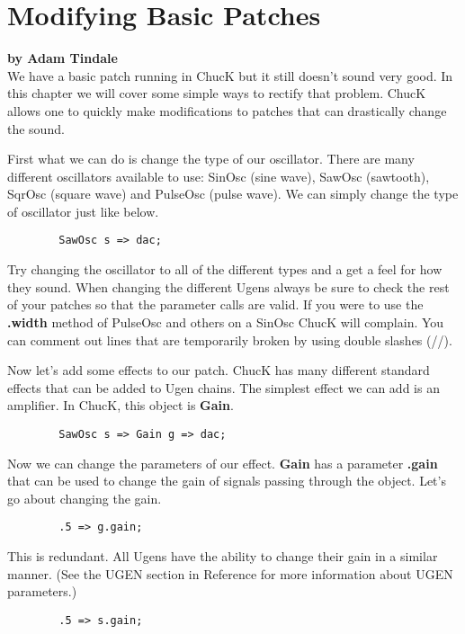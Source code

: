 \section{Modifying Basic Patches}
\textbf{by Adam Tindale}\\

We have a basic patch running in ChucK but it still doesn't sound very good. In this chapter we will cover some simple ways to rectify that problem. ChucK allows one to quickly make modifications to patches that can drastically change the sound.

First what we can do is change the type of our oscillator. There are many different oscillators available to use: SinOsc (sine wave), SawOsc (sawtooth), SqrOsc (square wave) and PulseOsc (pulse wave). We can simply change the type of oscillator just like below. 

\begin{verbatim}
        SawOsc s => dac;
\end{verbatim}

Try changing the oscillator to all of the different types and a get a feel for how they sound. When changing the different Ugens always be sure to check the rest of your patches so that the parameter calls are valid. If you were to use the {\bf .width} method of PulseOsc and others on a SinOsc ChucK will complain. You can comment out lines that are temporarily broken by using double slashes (//).

Now let's add some effects to our patch. ChucK has many different standard effects that can be added to Ugen chains. The simplest effect we can add is an amplifier. In ChucK, this object is {\bf Gain}.

\begin{verbatim}
        SawOsc s => Gain g => dac;
\end{verbatim}

Now we can change the parameters of our effect. {\bf Gain} has a parameter {\bf .gain} that can be used to change the gain  of signals passing through the object. Let's go about changing the gain.

\begin{verbatim}
        .5 => g.gain;
\end{verbatim}

This is redundant. All Ugens have the ability to change their gain in a similar manner. (See the UGEN section in Reference for more information about UGEN parameters.)

\begin{verbatim}
        .5 => s.gain;
\end{verbatim}

